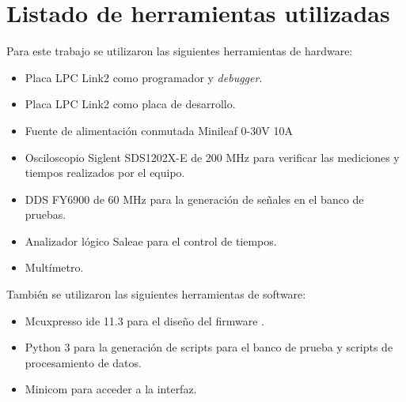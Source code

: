 \section{Listado de herramientas utilizadas}
Para este trabajo se utilizaron las siguientes herramientas de hardware:
\begin{itemize}
\item Placa LPC Link2 como programador y \textit{debugger}.
\item Placa LPC Link2 como placa de desarrollo.
\item Fuente de alimentación conmutada Minileaf 0-30V 10A
\item Osciloscopio Siglent SDS1202X-E de 200 MHz para verificar las mediciones y tiempos realizados por el equipo.
\item DDS FY6900 de 60 MHz para la generación de señales en el banco de pruebas.
\item Analizador lógico Saleae para el control de tiempos.
\item Multímetro.
\end{itemize}


También se utilizaron las siguientes herramientas de software:
\begin{itemize}
\item Mcuxpresso ide 11.3 para el diseño del firmware \citep{mcuxpresso}.
\item Python 3 para la generación de scripts para el banco de prueba y scripts de procesamiento de datos.
\item Minicom para acceder a la interfaz.
\end{itemize}
